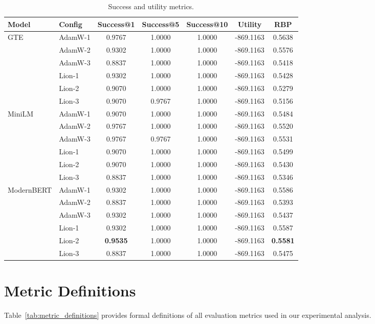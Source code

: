 \documentclass[conference]{IEEEtran}
\begin{document}
\begin{table}[t]
\centering
\caption{Success and utility metrics.}
\label{tab:success_metrics}
\small
\begin{tabular}{llccccc}
\toprule
\textbf{Model} & \textbf{Config} & \textbf{Success@1} & \textbf{Success@5} & \textbf{Success@10} & \textbf{Utility} & \textbf{RBP} \\
\midrule
\multirow{6}{*}{GTE} & AdamW-1 & 0.9767 & 1.0000 & 1.0000 & -869.1163 & 0.5638 \\
 & AdamW-2 & 0.9302 & 1.0000 & 1.0000 & -869.1163 & 0.5576 \\
 & AdamW-3 & 0.8837 & 1.0000 & 1.0000 & -869.1163 & 0.5418 \\
 & Lion-1 & 0.9302 & 1.0000 & 1.0000 & -869.1163 & 0.5428 \\
 & Lion-2 & 0.9070 & 1.0000 & 1.0000 & -869.1163 & 0.5279 \\
 & Lion-3 & 0.9070 & 0.9767 & 1.0000 & -869.1163 & 0.5156 \\
\midrule
\multirow{6}{*}{MiniLM} & AdamW-1 & 0.9070 & 1.0000 & 1.0000 & -869.1163 & 0.5484 \\
 & AdamW-2 & 0.9767 & 1.0000 & 1.0000 & -869.1163 & 0.5520 \\
 & AdamW-3 & 0.9767 & 0.9767 & 1.0000 & -869.1163 & 0.5531 \\
 & Lion-1 & 0.9070 & 1.0000 & 1.0000 & -869.1163 & 0.5499 \\
 & Lion-2 & 0.9070 & 1.0000 & 1.0000 & -869.1163 & 0.5430 \\
 & Lion-3 & 0.8837 & 1.0000 & 1.0000 & -869.1163 & 0.5346 \\
\midrule
\multirow{6}{*}{ModernBERT} & AdamW-1 & 0.9302 & 1.0000 & 1.0000 & -869.1163 & 0.5586 \\
 & AdamW-2 & 0.8837 & 1.0000 & 1.0000 & -869.1163 & 0.5393 \\
 & AdamW-3 & 0.9302 & 1.0000 & 1.0000 & -869.1163 & 0.5437 \\
 & Lion-1 & 0.9302 & 1.0000 & 1.0000 & -869.1163 & 0.5587 \\
 & Lion-2 & \textbf{0.9535} & 1.0000 & 1.0000 & -869.1163 & \textbf{0.5581} \\
 & Lion-3 & 0.8837 & 1.0000 & 1.0000 & -869.1163 & 0.5475 \\
\bottomrule
\end{tabular}
\end{table}

\section{Metric Definitions}
\label{app:metric_defs}
Table~\ref{tab:metric_definitions} provides formal definitions of all evaluation metrics used in our experimental analysis.
\end{document}
